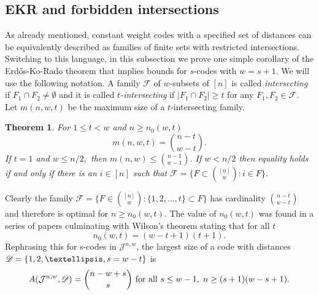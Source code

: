 \documentclass{amsart}
\newtheorem{theoremenv}[definitionenv]{Theorem}
\newenvironment{theorem}{\begin{theoremenv}\rm}{\end{theoremenv}}
\newcommand{\cF}{\mathcal{F}}
\newcommand{\cJ}{\mathcal{J}}
\begin{document}
\subsection{EKR and forbidden intersections}\label{sec:forbidden}
As already mentioned, constant weight codes with a specified set of distances can be equivalently described as families of
finite sets with restricted intersections. Switching to this language, in this subsection we prove one simple corollary of the Erd{\H o}s-Ko-Rado theorem that implies bounds for $s$-codes with $w=s+1.$ We will use the following notation. 
 A family $\cF$ of $w$-subsets of $[n]$ is called {\em intersecting} if $F_1\cap F_2\ne\emptyset$ and it is called {\em $t$-intersecting} if $|F_1\cap F_2|\ge t$ for any $F_1,F_2\in \cF.$ Let $m(n,w,t)$ be the maximum size of a $t$-intersecting family. 

\begin{theorem}\cite{EKR61} \label{EKR}
For $1\le t< w$ and $n\ge n_0(w,t)$
   \begin{equation}\label{eq:EKR}
     m(n,w,t)=\binom{n-t}{w-t}.
   \end{equation}
If $t=1$ and $w\le n/2,$ then $m(n,w)\le \binom {n-1}{w-1}.$ If $w<n/2$ then equality holds if and only if there is an $i\in [n]$ such that
$\cF=\{F\subset\binom{[n]}w: i\in F\}.$
\end{theorem}
Clearly the family $\cF=\{F\in \binom{[n]}w: \{1,2,\dots,t\}\subset F\}$ has cardinality $\binom{n-t}{w-t}$ and therefore is 
optimal for $n\ge n_0(w,t)$. The value of $n_0(w,t)$ was found in a series of papers culminating with Wilson's theorem \cite{W84} 
stating that for all $t$
  $$
  n_0(w,t)=(w-t+1)(t+1).
  $$
Rephrasing this for s-codes in $\cJ^{n,w}$, the largest size of a code with distances $\sD=\{1,2,\dots,s=w-t\}$ is 
  \begin{equation}\label{eq:2-EKR}
  A(\cJ^{n,w},\sD)=\binom{n-w+s}{s} \text{ for all }s\le w-1,\;n\ge (s+1)(w-s+1).
  \end{equation}
\end{document}
